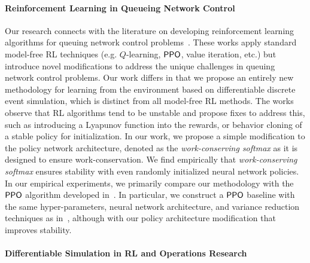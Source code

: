 \paragraph{Reinforcement Learning in Queueing Network Control}
Our research connects with the literature on developing reinforcement learning algorithms for queuing network control problems~\citep{moallemi2008approximate, shah2020stable, qu2020scalable, dai2022queueing, liu2022rl, wei2024sample, pavse2024learning}. These works apply standard model-free RL techniques (e.g. $Q$-learning, $\mathsf{PPO}$, value iteration, etc.) but introduce novel modifications to address the unique challenges in queuing network control problems. Our work differs in that we propose an entirely new methodology for learning from the environment based on differentiable discrete event simulation, which is distinct from all model-free RL methods. The works~\cite{shah2020stable,liu2022rl, dai2022queueing, pavse2024learning} observe that RL algorithms tend to be unstable and propose fixes to address this, such as introducing a Lyapunov function into the rewards, or behavior cloning of a stable policy for initialization. In our work, we propose a simple modification to the policy network architecture, denoted as the \emph{work-conserving softmax} as it is designed to ensure work-conservation. We find empirically that \emph{work-conserving softmax} ensures stability with even randomly initialized neural network policies. In our empirical experiments, we primarily compare our methodology with the $\mathsf{PPO}$ algorithm developed in~\cite{dai2022queueing}. In particular, we construct a $\mathsf{PPO}$ baseline with the same hyper-parameters, neural network architecture, and variance reduction techniques as in~\cite{dai2022queueing}, although with our policy architecture modification that improves stability. 

\paragraph{Differentiable Simulation in RL and Operations Research}

